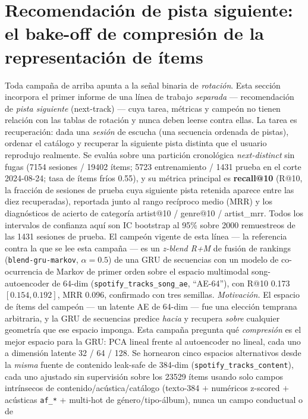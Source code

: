 \documentclass[11pt]{article}
\begin{document}
\section{Recomendación de pista siguiente: el bake-off de compresión de la representación de ítems}
\label{sec:nexttrack-compression}
Toda campaña de arriba apunta a la señal binaria de \emph{rotación}. Esta sección
incorpora el primer informe de una línea de trabajo \emph{separada} ---
recomendación de \emph{pista siguiente} (next-track) --- cuya tarea, métricas y
campeón no tienen relación con las tablas de rotación y nunca deben leerse contra
ellas. La tarea es recuperación: dada una \emph{sesión} de escucha (una secuencia
ordenada de pistas), ordenar el catálogo y recuperar la siguiente pista distinta
que el usuario reprodujo realmente. Se evalúa sobre una partición cronológica
\emph{next-distinct} sin fugas (\num{7154} sesiones / \num{19402} ítems;
\num{5723} entrenamiento / \num{1431} prueba en el corte 2024-08-24; tasa de
ítems fríos 0.55), y su métrica principal es \textbf{recall@10} (R@10, la fracción
de sesiones de prueba cuya siguiente pista retenida aparece entre las diez
recuperadas), reportada junto al rango recíproco medio (MRR) y los diagnósticos de
acierto de categoría artist@10 / genre@10 / artist\_mrr. Todos los intervalos de
confianza aquí son IC bootstrap al 95\% sobre \num{2000} remuestreos de las
\num{1431} sesiones de prueba. El campeón vigente de esta línea --- la referencia
contra la que se lee esta campaña --- es un \emph{z-blend R+M} de fusión de
rankings (\texttt{blend-gru-markov}, $\alpha{=}0.5$) de una GRU de secuencias con
un modelo de co-ocurrencia de Markov de primer orden sobre el espacio multimodal
song-autoencoder de 64-dim (\texttt{spotify\_tracks\_song\_ae}, ``AE-64''), con
R@10 \num{0.173} $[0.154, 0.192]$, MRR \num{0.096}, confirmado con tres semillas.
\emph{Motivación.} El espacio de ítems del campeón --- un latente AE de 64-dim ---
fue una elección temprana arbitraria, y la GRU de secuencias predice \emph{hacia} y
recupera \emph{sobre} cualquier geometría que ese espacio imponga. Esta campaña
pregunta qué \emph{compresión} es el mejor espacio para la GRU: PCA lineal frente al
autoencoder no lineal, cada uno a dimensión latente 32 / 64 / 128. Se hornearon
cinco espacios alternativos desde la \emph{misma} fuente de contenido leak-safe de
384-dim (\texttt{spotify\_tracks\_content}), cada uno ajustado sin supervisión
sobre los \num{23529} ítems usando solo campos intrínsecos de
contenido/acústica/catálogo (texto-384 $+$ numéricos z-scored $+$ acústicas
\texttt{af\_*} $+$ multi-hot de género/tipo-álbum), nunca un campo conductual o de
\end{document}
